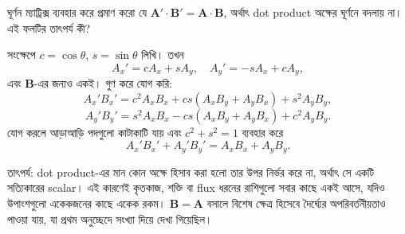 \documentclass[11pt]{article}
\begin{document}
 ঘূর্ণন ম্যাট্রিক্স ব্যবহার করে প্রমাণ করো যে
$\mathbf{A}'\cdot\mathbf{B}' = \mathbf{A}\cdot\mathbf{B}$, অর্থাৎ dot product
অক্ষের ঘূর্ণনে বদলায় না। এই ফলটির তাৎপর্য কী?

\begin{sol}
সংক্ষেপে $c = \cos\theta$, $s = \sin\theta$ লিখি। তখন
\[
  A_{x}' = cA_{x}+sA_{y}, \quad A_{y}' = -sA_{x}+cA_{y} ,
\]
এবং $\mathbf{B}$-এর জন্যও একই। গুণ করে যোগ করি:
\[
  A_{x}'B_{x}' = c^{2}A_{x}B_{x} + cs\left( A_{x}B_{y}+A_{y}B_{x} \right)
  + s^{2}A_{y}B_{y} ,
\]
\[
  A_{y}'B_{y}' = s^{2}A_{x}B_{x} - cs\left( A_{x}B_{y}+A_{y}B_{x} \right)
  + c^{2}A_{y}B_{y} .
\]
যোগ করলে আড়াআড়ি পদগুলো কাটাকাটি যায় এবং $c^{2}+s^{2} = 1$ ব্যবহার করে
\[
  A_{x}'B_{x}' + A_{y}'B_{y}' = A_{x}B_{x} + A_{y}B_{y} .
\]

তাৎপর্য: dot product-এর মান কোন অক্ষে হিসাব করা হলো তার উপর নির্ভর করে না,
অর্থাৎ সে একটি সত্যিকারের scalar। এই কারণেই কৃতকাজ, শক্তি বা flux ধরনের
রাশিগুলো সবার কাছে একই আসে, যদিও উপাংশগুলো একেকজনের কাছে একেক রকম।
$\mathbf{B} = \mathbf{A}$ বসালে বিশেষ ক্ষেত্র হিসেবে দৈর্ঘ্যের অপরিবর্তনীয়তাও
পাওয়া যায়, যা প্রথম অনুচ্ছেদে সংখ্যা দিয়ে দেখা গিয়েছিল।
\end{sol}
\end{document}
